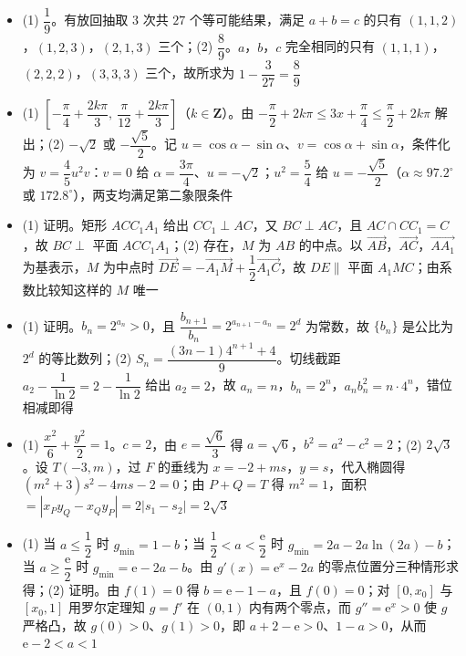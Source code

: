 \begin{itemize}[leftmargin=2.6em]
  \item[\textbf{16.}] (1) $\dfrac19$。有放回抽取 $3$ 次共 $27$ 个等可能结果，满足 $a+b=c$ 的只有 $(1,1,2)$，$(1,2,3)$，$(2,1,3)$ 三个；(2) $\dfrac89$。$a$，$b$，$c$ 完全相同的只有 $(1,1,1)$，$(2,2,2)$，$(3,3,3)$ 三个，故所求为 $1-\dfrac3{27}=\dfrac89$
  \item[\textbf{17.}] (1) $\left[-\dfrac\pi4+\dfrac{2k\pi}3,\ \dfrac\pi{12}+\dfrac{2k\pi}3\right]$（$k\in\mathbf Z$）。由 $-\dfrac\pi2+2k\pi\leqslant 3x+\dfrac\pi4\leqslant\dfrac\pi2+2k\pi$ 解出；(2) $-\sqrt2$ 或 $-\dfrac{\sqrt5}2$。记 $u=\cos\alpha-\sin\alpha$、$v=\cos\alpha+\sin\alpha$，条件化为 $v=\dfrac45u^2v$：$v=0$ 给 $\alpha=\dfrac{3\pi}4$、$u=-\sqrt2$；$u^2=\dfrac54$ 给 $u=-\dfrac{\sqrt5}2$（$\alpha\approx97.2^\circ$ 或 $172.8^\circ$），两支均满足第二象限条件
  \item[\textbf{18.}] (1) 证明。矩形 $ACC_1A_1$ 给出 $CC_1\perp AC$，又 $BC\perp AC$，且 $AC\cap CC_1=C$，故 $BC\perp$ 平面 $ACC_1A_1$；(2) 存在，$M$ 为 $AB$ 的中点。以 $\overrightarrow{AB}$，$\overrightarrow{AC}$，$\overrightarrow{AA_1}$ 为基表示，$M$ 为中点时 $\overrightarrow{DE}=-\overrightarrow{A_1M}+\dfrac12\overrightarrow{A_1C}$，故 $DE\parallel$ 平面 $A_1MC$；由系数比较知这样的 $M$ 唯一
  \item[\textbf{19.}] (1) 证明。$b_n=2^{a_n}>0$，且 $\dfrac{b_{n+1}}{b_n}=2^{a_{n+1}-a_n}=2^d$ 为常数，故 $\{b_n\}$ 是公比为 $2^d$ 的等比数列；(2) $S_n=\dfrac{(3n-1)4^{n+1}+4}9$。切线截距 $a_2-\dfrac1{\ln2}=2-\dfrac1{\ln2}$ 给出 $a_2=2$，故 $a_n=n$，$b_n=2^n$，$a_nb_n^2=n\cdot4^n$，错位相减即得
  \item[\textbf{20.}] (1) $\dfrac{x^2}6+\dfrac{y^2}2=1$。$c=2$，由 $e=\dfrac{\sqrt6}3$ 得 $a=\sqrt6$，$b^2=a^2-c^2=2$；(2) $2\sqrt3$。设 $T(-3,m)$，过 $F$ 的垂线为 $x=-2+ms$，$y=s$，代入椭圆得 $(m^2+3)s^2-4ms-2=0$；由 $P+Q=T$ 得 $m^2=1$，面积 $=|x_Py_Q-x_Qy_P|=2|s_1-s_2|=2\sqrt3$
  \item[\textbf{21.}] (1) 当 $a\leqslant\dfrac12$ 时 $g_{\min}=1-b$；当 $\dfrac12<a<\dfrac{\mathrm e}2$ 时 $g_{\min}=2a-2a\ln(2a)-b$；当 $a\geqslant\dfrac{\mathrm e}2$ 时 $g_{\min}=\mathrm e-2a-b$。由 $g'(x)=\mathrm e^x-2a$ 的零点位置分三种情形求得；(2) 证明。由 $f(1)=0$ 得 $b=\mathrm e-1-a$，且 $f(0)=0$；对 $[0,x_0]$ 与 $[x_0,1]$ 用罗尔定理知 $g=f'$ 在 $(0,1)$ 内有两个零点，而 $g''=\mathrm e^x>0$ 使 $g$ 严格凸，故 $g(0)>0$、$g(1)>0$，即 $a+2-\mathrm e>0$、$1-a>0$，从而 $\mathrm e-2<a<1$
\end{itemize}
